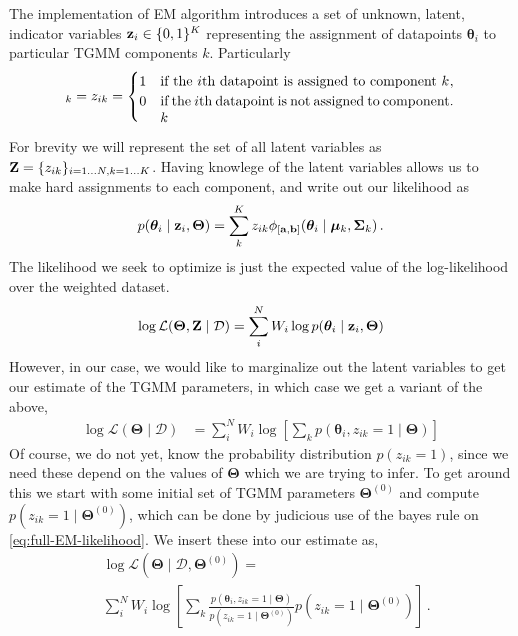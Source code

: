 \documentclass[twocolumn,usenames,dvipsnames,linenumbers]{aastex631}
\newcommand{\btheta}{\boldsymbol{\theta}}
\newcommand{\bmu}{\boldsymbol{\mu}}
\newcommand{\bSigma}{\boldsymbol{\Sigma}}
\newcommand{\ba}{{\bf a}}
\newcommand{\bb}{{\bf b}}
\newcommand{\bZ}{{\bf Z}}
\newcommand{\bTheta}{\boldsymbol{\Theta}}
\begin{document}
The implementation of EM algorithm introduces a set of unknown, latent, indicator variables ${\bf z}_{i} \in \{0,1\}^K$ representing the assignment of datapoints $\btheta_i$ to particular TGMM components $k$. Particularly
\begin{equation}
	[{\bf z}_i]_k = z_{ik} =
	\begin{cases}
		1 & \parbox[t]{0.6\linewidth}{if the $i$th datapoint is assigned to component $k$}, \\
		0 & \parbox[t]{0.6\linewidth}{if the $i$th datapoint is not assigned to component $k$}.
	\end{cases}
\end{equation}

For brevity we will represent the set of all latent variables as $\bZ = \{z_{ik}\}_{i=1\dots N, k=1\dots K}$. Having knowlege of the latent variables allows us to make hard assignments to each component, and write out our likelihood as
\begin{equation}
	\label{eq:full-EM-likelihood}
	p(\btheta_i \mid \mathcal  {\bf z}_i, \bTheta) = \sum_k^K z_{ik} \phi_{[\ba, \bb]}(\btheta_i \mid \bmu_k, \bSigma_k)\,.
\end{equation}
The likelihood we seek to optimize is just the expected value of the log-likelihood over the weighted dataset. 
\begin{equation}
	\log\mathcal{L}(\bTheta, \bZ \mid \mathcal D) =  \sum_i^N W_i \log p(\btheta_i \mid \mathcal {\bf z}_i, \bTheta)
\end{equation}
However, in our case, we would like to marginalize  out the latent variables to get our estimate of the TGMM parameters, in which case we get a variant of the above, 
\begin{equation}
	\begin{aligned}
			\log\mathcal{L}(\bTheta \mid \mathcal D) &=  \sum_i^N W_i \log\left[ \sum_k p(\btheta_i, z_{ik} = 1\mid \bTheta)\right]
	\end{aligned}
\end{equation}
Of course, we do not yet, know the probability distribution $p(z_{ik} = 1)$, since we need these depend on the values of $\bTheta$ which we are trying to infer. 
To get around this we start with some initial set of TGMM parameters $\bTheta^{(0)}$ and compute $p(z_{ik}= 1\mid \bTheta^{(0)})$, which can be done by judicious use of the bayes rule on \eqref{eq:full-EM-likelihood}. We insert these into our estimate as,
\begin{equation}
	\begin{aligned}
		&\log\mathcal{L}(\bTheta \mid \mathcal D, \bTheta^{(0)}) = \\ &\sum_i^N W_i \log\left[ \sum_k \frac{p(\btheta_i ,z_{ik} = 1 \mid \bTheta)}{p(z_{ik} = 1 \mid \bTheta^{(0)})} p(z_{ik} = 1 \mid \bTheta^{(0)}) \right]\,.
	\end{aligned}
\end{equation}
\end{document}
